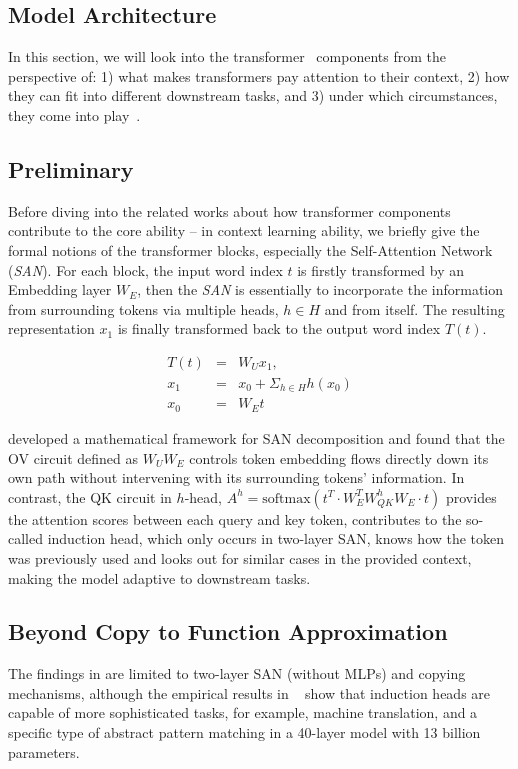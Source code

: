 \subsection{Model Architecture}
In this section, we will look into the transformer~\cite{DBLP:conf/nips/BrownMRSKDNSSAA20} components from the perspective of: 1) what makes transformers pay attention to their context, 2) how they can fit into different downstream tasks, and 3) under which circumstances, they come into play~\cite{von2023transformers}.

\subsection{Preliminary}
Before diving into the related works about how transformer components contribute to the core ability -- in context learning ability, we briefly give the formal notions of the transformer blocks, especially the Self-Attention Network (\textsl{SAN}). For each block, the input word index $t$ is firstly transformed by an Embedding layer $W_{E}$, then the \textsl{SAN} is essentially to incorporate the information from surrounding tokens via multiple heads, $h\in H$ and from itself. The resulting representation $x_1$ is finally transformed back to the output word index $T(t)$.

\begin{eqnarray}
    T(t)& =& W_{U}x_1,\nonumber  \\
    x_1& =& x_0+ \Sigma_{h\in H}h(x_0)\nonumber  \\
    x_0& =& W_E t
\end{eqnarray}

\citet{elhage2021mathematical} developed a mathematical framework for SAN decomposition and found that the OV circuit defined as $W_U W_E$ controls token embedding flows directly down its own path without intervening with its surrounding tokens' information. In contrast, the QK circuit in $h$-head, $A^{h} = \text{softmax}(t^{T}\cdot W_E^{T}W_{QK}^{h}W_{E}\cdot t)$ provides the attention scores between each query and key token, contributes to the so-called induction head, which only occurs in two-layer SAN, knows how the token was previously used and looks out for similar cases in the provided context, making the model adaptive to downstream tasks.

\subsection{Beyond Copy to Function Approximation}
The findings in \cite{elhage2021mathematical,olsson2022context} are limited to two-layer SAN (without MLPs) and copying mechanisms, although the empirical results in ~\citet{olsson2022context} show that induction heads are capable of more sophisticated tasks, for example, machine translation, and a specific type of abstract pattern matching in a 40-layer model with 13 billion parameters. 

